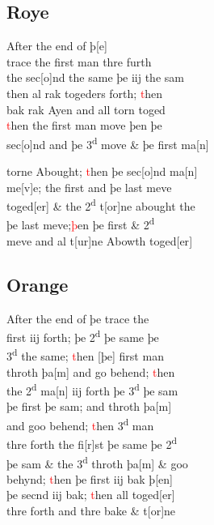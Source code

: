 \documentclass[12pt,letter]{article} %
\newcommand{\red}[1]{\textcolor{red}{#1}}
\newcommand{\srcpg}[1]{
    \noindent{
        \color{Gray}{\rule[0.5ex]{\linewidth}{1pt}~#1} 
    
    }
}
\begin{document}
\subsection{Roye}
After the end of þ{[}e{]}\\
trace the first man thre furth\\
the sec{[}o{]}nd the same þe iij the sam\\
then al rak togeders forth; \red{t}hen\\
bak rak Ayen and all torn toged\\
\red{t}hen the first man move þen þe\\
sec{[}o{]}nd and þe 3\textsuperscript{d} move \& þe first ma{[}n{]} 
\srcpg{66}
 torne Abought; \red{t}hen þe sec{[}o{]}nd ma{[}n{]}\\
me{[}v{]}e; the first and þe last meve\\
toged{[}er{]} \& the 2\textsuperscript{d} t{[}or{]}ne abought the\\
þe last meve;\red{þ}en þe first \& 2\textsuperscript{d}\\
meve and al t{[}ur{]}ne Abowth toged{[}er{]}

\subsection{Orange}
After the end of þe trace the\\
first iij forth; þe 2\textsuperscript{d} þe same þe\\
3\textsuperscript{d} the same; \red{t}hen {[}þe{]} first man\\
throth þa{[}m{]} and go behend; \red{t}hen\\
the 2\textsuperscript{d} ma{[}n{]} iij forth þe 3\textsuperscript{d} þe sam\\
þe first þe sam; and throth þa{[}m{]}\\
and goo behend; \red{t}hen 3\textsuperscript{d} man\\
thre forth the  fi{[}r{]}st þe same þe 2\textsuperscript{d}\\
þe sam \& the 3\textsuperscript{d} throth þa{[}m{]} \& goo\\
behynd; \red{t}hen þe first iij bak þ{[}en{]}\\
þe secnd iij bak; \red{t}hen all toged{[}er{]}\\
thre forth and thre bake \& t{[}or{]}ne
\end{document}
